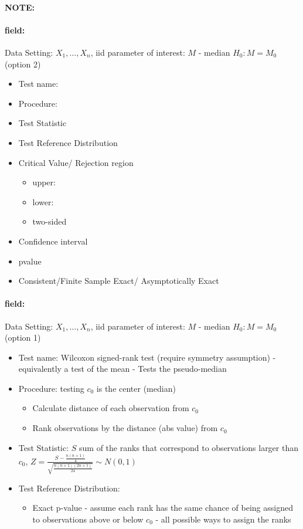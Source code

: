 \documentclass[12pt]{article}
\newenvironment{note}{\paragraph{NOTE:}}{}
\newenvironment{field}{\paragraph{field:}}{}
\begin{document}
\begin{note}
    \begin{field}
      Data Setting: $X_1, \ldots, X_n$, iid parameter of interest: $M$ - median $H_0: M = M_0$ (option 2)
      \begin{itemize}
        \item Test name:
        \item Procedure:
        \item Test Statistic
        \item Test Reference Distribution
        \item Critical Value/ Rejection region
              \begin{itemize}
                \item upper:
                \item lower:
                \item two-sided
              \end{itemize}
        \item Confidence interval
        \item pvalue
        \item Consistent/Finite Sample Exact/ Asymptotically Exact
      \end{itemize}
    \end{field}
  \begin{field}
    Data Setting: $X_1, \ldots, X_n$, iid parameter of interest: $M$ - median $H_0: M = M_0$ (option 1)
    \begin{itemize}
      \item Test name: Wilcoxon signed-rank test (require symmetry assumption) - equivalently a test of the mean - Tests the pseudo-median
      \item Procedure: testing $c_0$ is the center (median)
      \begin{itemize}
        \item Calculate distance of each observation from $c_0$
        \item Rank observations by the distance (abs value) from $c_0$
      \end{itemize}
      \item Test Statistic: $S$ sum of the ranks that correspond to observations larger than $c_0$, $Z = \frac{S - \frac{n(n+1)}{4}}{\sqrt{\frac{n(n+1)(2n+1)}{24}}} \sim N(0,1)$
      \item Test Reference Distribution:
       \begin{itemize}
         \item Exact p-value - assume each rank has the same chance of being assigned to observations above or below $c_0$ - all possible ways to assign the ranks

\end{itemize}
\end{itemize}
\end{field}
\end{note}
\end{document}
